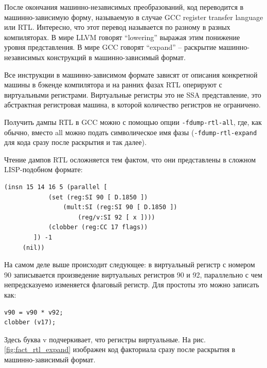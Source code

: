 \documentclass[a4paper,12pt,oneside]{article}
\begin{document}
После окончания машинно-независимых преобразований, код переводится в машинно-зависимую форму, называемую в случае GCC register transfer language или RTL. Интересно, что этот перевод называется по разному в разных компиляторах. В мире LLVM говорят ``lowering'' выражая этим понижение уровня представления. В мире GCC говорят ``expand'' -- раскрытие машинно-независимых конструкций в машинно-зависимый формат.

Все инструкции в машинно-зависимом формате зависят от описания конкретной машины в бэкенде компилятора и на ранних фазах RTL оперируют с виртуальными регистрами. Виртуальные регистры это не SSA представление, это абстрактная регистровая машина, в которой количество регистров не ограничено.

Получить дампы RTL в GCC можно с помощью опции \lstinline!-fdump-rtl-all!, где, как обычно, вместо all можно подать символическое имя фазы (\lstinline!-fdump-rtl-expand! для кода сразу после раскрытия и так далее).

Чтение дампов RTL осложняется тем фактом, что они представлены в сложном LISP-подобном формате:

\begin{verbatim}
(insn 15 14 16 5 (parallel [
            (set (reg:SI 90 [ D.1850 ])
                (mult:SI (reg:SI 90 [ D.1850 ])
                    (reg/v:SI 92 [ x ])))
            (clobber (reg:CC 17 flags))
        ]) -1
     (nil))
\end{verbatim}

На самом деле выше происходит следующее: в виртуальный регистр с номером 90 записывается произведение виртуальных регистров 90 и 92, параллельно с чем непредсказуемо изменяется флаговый регистр. Для простоты это можно записать как:

\begin{lstlisting}
v90 = v90 * v92;
clobber (v17);
\end{lstlisting}

Здесь буква v подчеркивает, что регистры виртуальные. На рис. \ref{fig:fact_rtl_expand} изображен код факториала сразу после раскрытия в машинно-зависимый формат.
\end{document}
